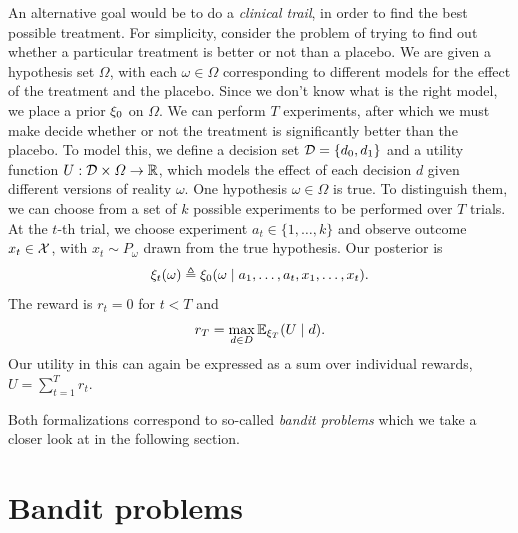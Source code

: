 \begin{example}
  An alternative goal would be to do a \emph{clinical trail}, in order to find the best possible treatment. For simplicity, consider the problem of trying to find out whether a particular treatment is better or not than a placebo.  We are given a hypothesis set $\Omega$, with each $\omega \in \Omega$ corresponding to different models for the effect of the treatment and the placebo. Since we don't know what is the right model, we place a prior $\xi_0$ on $\Omega$. We can perform $T$ experiments, after which we must make decide whether or not the treatment is significantly better than the placebo. To model this, we define a decision set ${\mathcal{D}} = \{d_0, d_1\}$ and a utility function $U : {\mathcal{D}} \times \Omega \to {\mathbb{R}}$, which models the effect of each decision $d$ given different versions of reality $\omega$. One hypothesis $\omega \in \Omega$ is true. To distinguish them, we can choose
  from a set of $k$ possible experiments to be performed over $T$
  trials.  At the $t$-th trial, we choose experiment $a_t \in \{1,
  \ldots, k\}$ and observe outcome $x_t \in {\mathcal{X}}$, with $x_t \sim
  P_\omega$ drawn from the true hypothesis. Our posterior is
  \[
  \xi_t(\omega) \mathrel{\triangleq}
  \xi_0(\omega \mid a_1, \ldots, a_t, x_1, \ldots, x_t).
  \]
  The reward is $r_t = 0$ for $t < T$ and
  \[
  r_T = \max_{d \in D}\mathop{\mbox{\ensuremath{\mathbb{E}}}}\nolimits_{\xi_T}(U \mid d).
  \]
  Our utility in this can again be expressed as a sum over individual rewards,  $U = \sum_{t=1}^T r_t$.
\end{example}
Both formalizations correspond to so-called {\em bandit problems} which we take a closer look at in the following section.

\section{Bandit problems}
\label{sec:exp-design-bandit}


